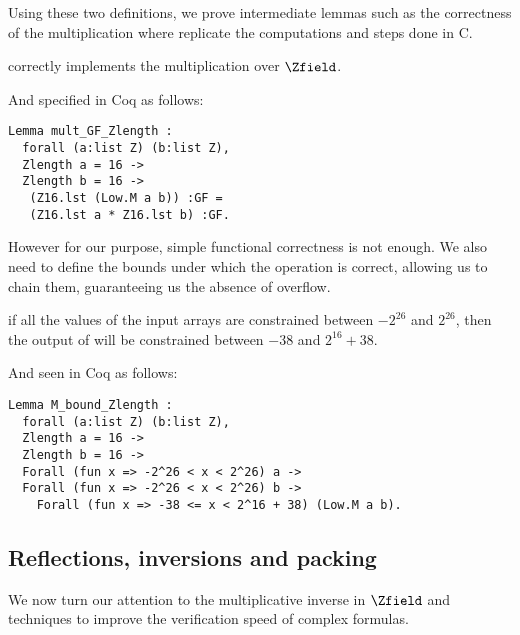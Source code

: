 Using these two definitions, we prove intermediate lemmas such as the correctness of the
multiplication  where  replicate the computations and steps done in C.
\begin{lemma}
  \label{lemma:mult_correct}
   correctly implements the multiplication over $\Zfield$.
\end{lemma}
And specified in Coq as follows:
\begin{lstlisting}[language=Coq]
Lemma mult_GF_Zlength :
  forall (a:list Z) (b:list Z),
  Zlength a = 16 ->
  Zlength b = 16 ->
   (Z16.lst (Low.M a b)) :GF =
   (Z16.lst a * Z16.lst b) :GF.
\end{lstlisting}

However for our purpose, simple functional correctness is not enough.
We also need to define the bounds under which the operation is correct,
allowing us to chain them, guaranteeing us the absence of overflow.

\begin{lemma}
  \label{lemma:mult_bounded}
  if all the values of the input arrays are constrained between $-2^{26}$ and $2^{26}$,
  then the output of  will be constrained between $-38$ and $2^{16} + 38$.
\end{lemma}
And seen in Coq as follows:
\begin{lstlisting}[language=Coq]
Lemma M_bound_Zlength :
  forall (a:list Z) (b:list Z),
  Zlength a = 16 ->
  Zlength b = 16 ->
  Forall (fun x => -2^26 < x < 2^26) a ->
  Forall (fun x => -2^26 < x < 2^26) b ->
    Forall (fun x => -38 <= x < 2^16 + 38) (Low.M a b).
\end{lstlisting}





\subsection{Reflections, inversions and packing}
\label{subsec:inversions-reflections}

We now turn our attention to the multiplicative inverse in $\Zfield$ and techniques
to improve the verification speed of complex formulas.

